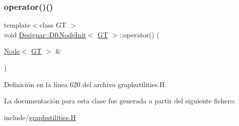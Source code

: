 \subsubsection{\texorpdfstring{operator()()}{operator()()}}
{\footnotesize\ttfamily template$<$class GT $>$ \\
void \hyperlink{class_designar_1_1_dft_node_init}{Designar\+::\+Dft\+Node\+Init}$<$ \hyperlink{demo-buildgraph_8_c_a3001c40d2c31ca87ed96cd7d1334a55e}{GT} $>$\+::operator() (\begin{DoxyParamCaption}\item[{\hyperlink{namespace_designar_a5af326c65aa2bd26b26c410f2030d09e}{Node}$<$ \hyperlink{demo-buildgraph_8_c_a3001c40d2c31ca87ed96cd7d1334a55e}{GT} $>$ \&}]{ }\end{DoxyParamCaption})\hspace{0.3cm}{\ttfamily [inline]}}



Definición en la línea 620 del archivo graphutilities.\+H.



La documentación para esta clase fue generada a partir del siguiente fichero\+:\begin{DoxyCompactItemize}
\item 
include/\hyperlink{graphutilities_8_h}{graphutilities.\+H}\end{DoxyCompactItemize}

